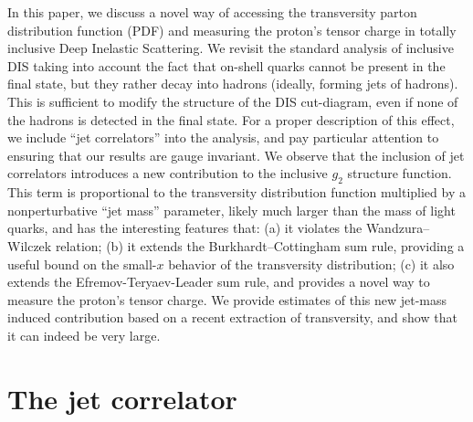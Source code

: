 \documentclass[preprintnumbers,floatfix,nofootinbib]{revtex4}
\begin{document}
In this paper, we discuss a novel way of accessing the transversity parton distribution function (PDF) and measuring the proton's tensor charge in totally inclusive Deep Inelastic Scattering. 
We revisit the standard analysis of inclusive DIS taking into account the fact
that on-shell quarks cannot be present in the final state, but they rather
decay into hadrons (ideally, forming jets of hadrons). This is sufficient to modify the structure of the DIS
cut-diagram, even if none of the hadrons is detected in the final
state. For a proper description of this effect, we include ``jet
correlators'' into the analysis, and pay particular attention to ensuring that our results are gauge invariant. We observe that the inclusion of jet correlators introduces a new
contribution to the inclusive $g_2$ structure function. This term is
proportional to the transversity distribution function multiplied by a
nonperturbative ``jet mass'' parameter, likely much larger than the mass of light quarks, and has the
interesting features that: (a) it violates the Wandzura--Wilczek relation; (b)
it extends the Burkhardt--Cottingham sum rule, providing a useful bound on the small-$x$ behavior of the transversity distribution; (c) it also extends the Efremov-Teryaev-Leader sum rule, and provides a novel way to measure the proton's tensor charge.
We provide estimates of this new jet-mass induced contribution based on a recent extraction of transversity, and show that it can indeed be very large.   
 

\section{The jet correlator}
\end{document}
